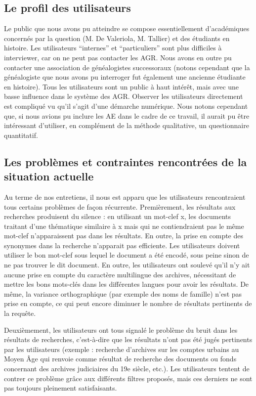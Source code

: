 \documentclass[a4paper,12pt]{article}
\begin{document}
\subsection{Le profil des utilisateurs}
Le public que nous avons pu atteindre se compose essentiellement d'académiques concernés par la question (M. De Valeriola, M. Tallier) et des étudiants en histoire. Les utilisateurs “internes” et “particuliers” sont plus difficiles à interviewer, car on ne peut pas contacter les AGR. Nous avons en outre pu contacter une association de généalogistes successoraux (notons cependant que la généalogiste que nous avons pu interroger fut également une ancienne étudiante en histoire).
Tous les utilisateurs sont un public à haut intérêt, mais avec une basse influence dans le système des AGR. Observer les utilisateurs directement est compliqué vu qu’il s’agit d’une démarche numérique. 
Nous notons cependant que, si nous avions pu inclure les AE dans le cadre de ce travail, il aurait pu être intéressant d'utiliser, en complément de la méthode qualitative, un questionnaire quantitatif.

\subsection{Les problèmes et contraintes rencontrées de la situation actuelle}
Au terme de nos entretiens, il nous est apparu que les utilisateurs rencontraient tous certains problèmes de façon récurrente. 
Premièrement, les résultats aux recherches produisent du silence : en utilisant un mot-clef x, les documents traitant d’une thématique similaire à x mais qui ne contiendraient pas le même mot-clef n’apparaissent pas dans les résultats. En outre, la prise en compte des synonymes dans la recherche n'apparait pas efficiente. Les utilisateurs doivent utiliser le bon mot-clef sous lequel le document a été encodé, sous peine sinon de ne pas trouver le dit document. En outre, les utilisateurs ont soulevé qu'il n’y ait aucune prise en compte du caractère multilingue des archives, nécessitant de mettre les bons mots-clés dans les différentes langues pour avoir les résultats. De même, la variance orthographique (par exemple des noms de famille) n’est pas prise en compte, ce qui peut encore diminuer le nombre de résultats pertinents de la requête. 

Deuxièmement, les utilisateurs ont tous signalé le problème du bruit dans les résultats de recherches, c'est-à-dire que les résultats n'ont pas été jugés pertinents par les utilisateurs (exemple : recherche d'archives sur les comptes urbains au Moyen Âge qui renvoie comme résultat de recherche des documents ou fonds concernant des archives judiciaires du 19e siècle, etc.). Les utilisateurs tentent de contrer ce problème grâce aux différents filtres proposés, mais ces derniers ne sont pas toujours pleinement satisfaisants. 
\end{document}

